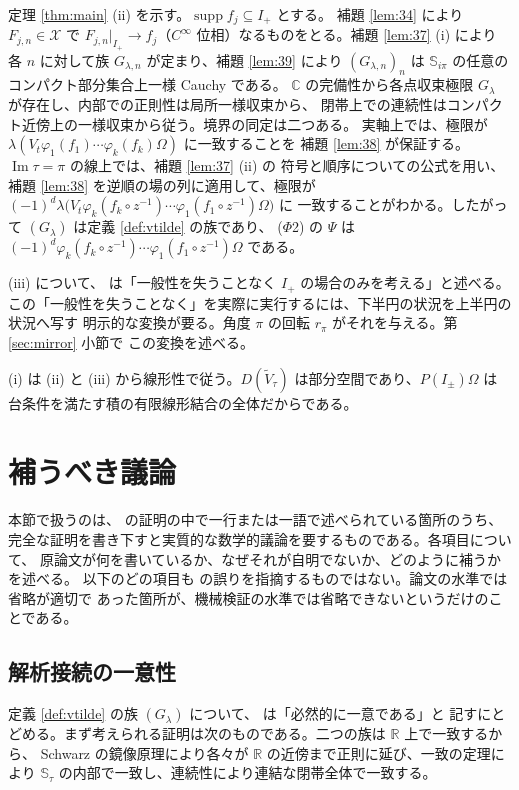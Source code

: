 \documentclass[11pt,a4paper]{article}
\newcommand{\Xcl}{\mathcal{X}}
\newcommand{\Strip}{\mathbb{S}}
\newcommand{\Vt}{\widetilde{V}}
\newcommand{\Dom}{D}
\theoremstyle{definition}
\begin{document}
定理 \ref{thm:main} (ii) を示す。$\operatorname{supp} f_j \subseteq I_+$ とする。
補題 \ref{lem:34} により $F_{j,n} \in \Xcl$ で
$F_{j,n}|_{I_+} \to f_j$（$C^\infty$ 位相）なるものをとる。補題 \ref{lem:37} (i) により
各 $n$ に対して族 $G_{\lambda,n}$ が定まり、補題 \ref{lem:39} により
$(G_{\lambda,n})_n$ は $\Strip_{i\pi}$ の任意のコンパクト部分集合上一様 Cauchy である。
$\mathbb{C}$ の完備性から各点収束極限 $G_\lambda$ が存在し、内部での正則性は局所一様収束から、
閉帯上での連続性はコンパクト近傍上の一様収束から従う。境界の同定は二つある。
実軸上では、極限が $\lambda(V_t \varphi_1(f_1)\cdots\varphi_k(f_k)\Omega)$ に一致することを
補題 \ref{lem:38} が保証する。$\operatorname{Im}\tau = \pi$ の線上では、補題 \ref{lem:37} (ii) の
符号と順序についての公式を用い、補題 \ref{lem:38} を逆順の場の列に適用して、極限が
$(-1)^d \lambda\bigl(V_t \varphi_k(f_k\circ z^{-1})\cdots\varphi_1(f_1\circ z^{-1})\Omega\bigr)$ に
一致することがわかる。したがって $(G_\lambda)$ は定義 \ref{def:vtilde} の族であり、
($\Phi$2) の $\Psi$ は $(-1)^d \varphi_k(f_k\circ z^{-1})\cdots\varphi_1(f_1\circ z^{-1})\Omega$ である。

(iii) について、\cite{T26} は「一般性を失うことなく $I_+$ の場合のみを考える」と述べる。
この「一般性を失うことなく」を実際に実行するには、下半円の状況を上半円の状況へ写す
明示的な変換が要る。角度 $\pi$ の回転 $r_\pi$ がそれを与える。第 \ref{sec:mirror} 小節で
この変換を述べる。

(i) は (ii) と (iii) から線形性で従う。$\Dom(\Vt_\tau)$ は部分空間であり、$P(I_\pm)\Omega$ は
台条件を満たす積の有限線形結合の全体だからである。

\section{補うべき議論}
\label{sec:gaps}

本節で扱うのは、\cite{T26} の証明の中で一行または一語で述べられている箇所のうち、
完全な証明を書き下すと実質的な数学的議論を要するものである。各項目について、
原論文が何を書いているか、なぜそれが自明でないか、どのように補うかを述べる。
以下のどの項目も \cite{T26} の誤りを指摘するものではない。論文の水準では省略が適切で
あった箇所が、機械検証の水準では省略できないというだけのことである。

\subsection{解析接続の一意性}
\label{sec:uniqueness}

定義 \ref{def:vtilde} の族 $(G_\lambda)$ について、\cite{T26} は「必然的に一意である」と
記すにとどめる。まず考えられる証明は次のものである。二つの族は $\mathbb{R}$ 上で一致するから、
Schwarz の鏡像原理により各々が $\mathbb{R}$ の近傍まで正則に延び、一致の定理により
$\Strip_\tau$ の内部で一致し、連続性により連結な閉帯全体で一致する。
\end{document}
